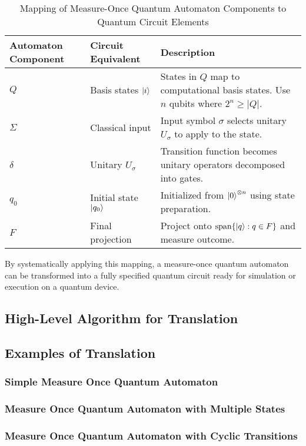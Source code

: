 \begin{table}[h]
    \centering
    \begin{tabularx}{\textwidth}{|l|l|X|}
    \hline
    \textbf{Automaton Component} & \textbf{Circuit Equivalent} & \textbf{Description} \\
    \hline
    $Q$ & Basis states $\ket{i}$ & States in $Q$ map to computational basis states. Use $n$ qubits where $2^n \geq |Q|$. \\
    \hline
    $\Sigma$ & Classical input & Input symbol $\sigma$ selects unitary $U_\sigma$ to apply to the state. \\
    \hline
    $\delta$ & Unitary $U_\sigma$ & Transition function becomes unitary operators decomposed into gates. \\
    \hline
    $q_0$ & Initial state $\ket{q_0}$ & Initialized from $\ket{0}^{\otimes n}$ using state preparation. \\
    \hline
    $F$ & Final projection & Project onto $\text{span}\{\ket{q} : q \in F\}$ and measure outcome. \\
    \hline
    \end{tabularx}
    \label{tab:automaton-to-circuit}
    \caption{Mapping of Measure-Once Quantum Automaton Components to Quantum Circuit Elements}
\end{table}

By systematically applying this mapping, a measure-once quantum automaton can be transformed into a fully specified quantum circuit ready for simulation or execution on a quantum device.

\subsection{High-Level Algorithm for Translation}

\subsection{Examples of Translation}
\subsubsection{Simple Measure Once Quantum Automaton}
\subsubsection{Measure Once Quantum Automaton with Multiple States}
\subsubsection{Measure Once Quantum Automaton with Cyclic Transitions}